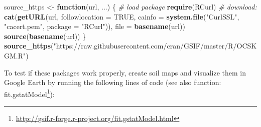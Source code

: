 \documentclass[11pt]{krantz}
\newenvironment{Shaded}{\begin{snugshade}}{\end{snugshade}}
\newcommand{\CommentTok}[1]{\textcolor[rgb]{0.37,0.37,0.37}{\textit{#1}}}
\newcommand{\ControlFlowTok}[1]{\textcolor[rgb]{0.27,0.27,0.27}{\textbf{#1}}}
\newcommand{\DataTypeTok}[1]{\textcolor[rgb]{0.27,0.27,0.27}{#1}}
\newcommand{\KeywordTok}[1]{\textcolor[rgb]{0.27,0.27,0.27}{\textbf{#1}}}
\newcommand{\NormalTok}[1]{#1}
\newcommand{\OtherTok}[1]{\textcolor[rgb]{0.37,0.37,0.37}{#1}}
\newcommand{\StringTok}[1]{\textcolor[rgb]{0.5,0.5,0.5}{#1}}
\renewcommand{\href}[2]{#2\footnote{\url{#1}}}
\theoremstyle{definition}
\theoremstyle{definition}
\theoremstyle{definition}
\theoremstyle{remark}
\begin{document}
\begin{Shaded}
\begin{Highlighting}[]
\NormalTok{source_https <-}\StringTok{ }\ControlFlowTok{function}\NormalTok{(url, ...) \{}
   \CommentTok{# load package}
   \KeywordTok{require}\NormalTok{(RCurl)}
   \CommentTok{# download:}
   \KeywordTok{cat}\NormalTok{(}\KeywordTok{getURL}\NormalTok{(url, }\DataTypeTok{followlocation =} \OtherTok{TRUE}\NormalTok{, }
       \DataTypeTok{cainfo =} \KeywordTok{system.file}\NormalTok{(}\StringTok{"CurlSSL"}\NormalTok{, }\StringTok{"cacert.pem"}\NormalTok{, }\DataTypeTok{package =} \StringTok{"RCurl"}\NormalTok{)), }
       \DataTypeTok{file =} \KeywordTok{basename}\NormalTok{(url))}
   \KeywordTok{source}\NormalTok{(}\KeywordTok{basename}\NormalTok{(url))}
\NormalTok{\}}
\KeywordTok{source_https}\NormalTok{(}\StringTok{"https://raw.githubusercontent.com/cran/GSIF/master/R/OCSKGM.R"}\NormalTok{)}
\end{Highlighting}
\end{Shaded}

To test if these packages work properly, create soil maps and visualize
them in Google Earth by running the following lines of code (see also
function:
\href{http://gsif.r-forge.r-project.org/fit.gstatModel.html}{fit.gstatModel}):
\end{document}
